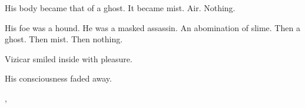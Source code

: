 
His body became that of a ghost. It became mist. Air. Nothing. 


His foe was a hound. He was a masked assassin. An abomination of slime. Then a ghost. Then mist. Then nothing. 


Vizicar smiled inside with pleasure. 

His consciousness faded away. 









\begin{comment}
\section{\Esmerel}
\end{comment}

\stamp
  {\dateMutiny}
  {, }
%

%
%
%
%
%

